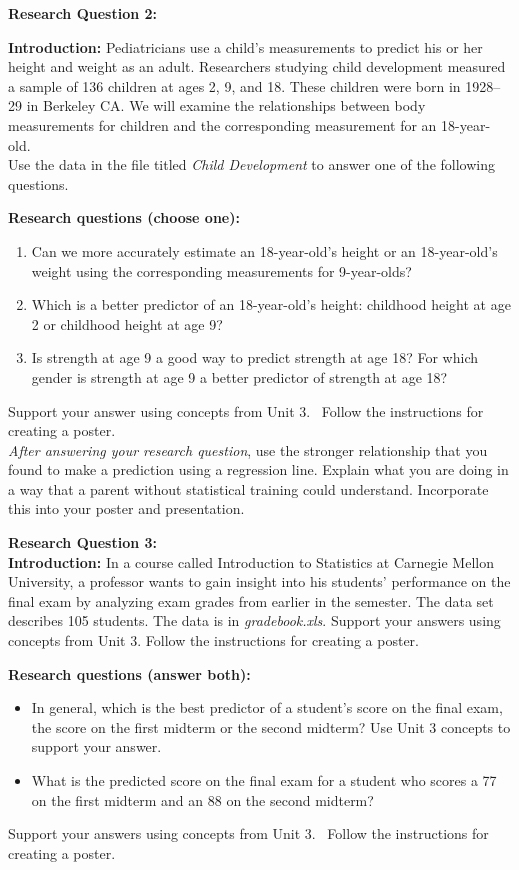 \textbf{\large{}Research Question 2:}{\large \par}

\textbf{Introduction:} Pediatricians use a child's measurements to
predict his or her height and weight as an adult. Researchers studying
child development measured a sample of 136 children at ages 2, 9,
and 18. These children were born in 1928--29 in Berkeley CA. We will
examine the relationships between body measurements for children and
the corresponding measurement for an 18-year-old.\\


Use the data in the file titled \emph{Child Development} to answer
one of the following questions.\bigskip{}


\textbf{Research questions (choose one):}
\begin{enumerate}
\item Can we more accurately estimate an 18-year-old's height or an 18-year-old's
weight using the corresponding measurements for 9-year-olds? 
\item Which is a better predictor of an 18-year-old's height: childhood
height at age 2 or childhood height at age 9? 
\item Is strength at age 9 a good way to predict strength at age 18? For
which gender is strength at age 9 a better predictor of strength at
age 18? 
\end{enumerate}
Support your answer using concepts from Unit 3. \ Follow the instructions
for creating a poster.\bigskip{}
\\
\emph{After answering your research question}, use the stronger relationship
that you found to make a prediction using a regression line. Explain
what you are doing in a way that a parent without statistical training
could understand. Incorporate this into your poster and presentation. 

\textbf{\clearpage{}}\textbf{\large{}Research Question 3:}\\


\textbf{Introduction:} In a course called Introduction to Statistics
at Carnegie Mellon University, a professor wants to gain insight into
his students' performance on the final exam by analyzing exam grades
from earlier in the semester. The data set describes 105 students.
The data is in \emph{gradebook.xls}. Support your answers using concepts
from Unit 3. Follow the instructions for creating a poster.\bigskip{}


\textbf{Research questions (answer both):}
\begin{itemize}
\item In general, which is the best predictor of a student's score on the
final exam, the score on the first midterm or the second midterm?
Use Unit 3 concepts to support your answer. 
\item What is the predicted score on the final exam for a student who scores
a 77 on the first midterm and an 88 on the second midterm? \ 
\end{itemize}
Support your answers using concepts from Unit 3. \ Follow the instructions
for creating a poster.

